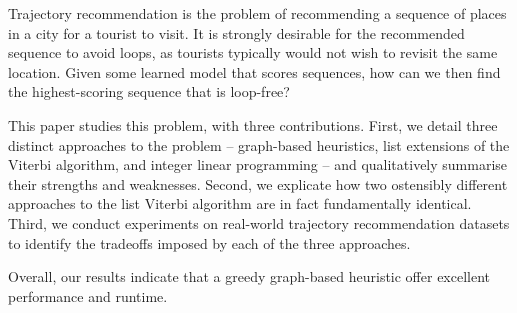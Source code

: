 
Trajectory recommendation is the problem of recommending a sequence of places in a city for a tourist to visit.
It is strongly desirable for the recommended sequence to avoid loops, as tourists typically would not wish to revisit the same location.
Given some learned model that scores sequences, how can we then find the highest-scoring sequence that is loop-free?

This paper studies this problem, with three contributions.
First, we detail three distinct approaches to the problem -- 
graph-based heuristics,
list extensions of the Viterbi algorithm,
and integer linear programming
-- and qualitatively summarise their strengths and weaknesses.
Second, we explicate how two ostensibly different approaches to the list Viterbi algorithm \citep{seshadri1994list,nilsson2001sequentially} are in fact fundamentally identical.
Third, we conduct experiments on real-world trajectory recommendation datasets to identify the tradeoffs imposed by each of the three approaches.

Overall, our results indicate that a greedy graph-based heuristic offer excellent performance and runtime.

